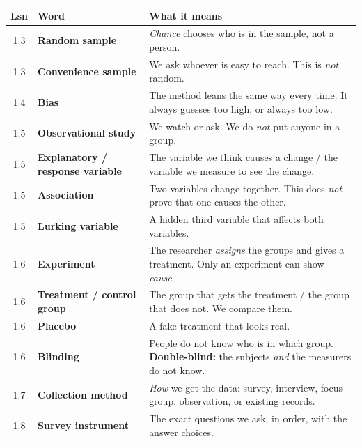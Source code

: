 \documentclass[10pt]{article}
\begin{document}
\vspace{4pt}
\boxguard[16]
\begin{tabularx}{\linewidth}{@{} c >{\raggedright\arraybackslash\bfseries}p{3.4cm} X @{}}
\rowcolor{frost}
\textbf{Lsn} & \textbf{Word} & \textbf{What it means} \\
\midrule
1.3 & Random sample & \emph{Chance} chooses who is in the sample, not a person. \\
1.3 & Convenience sample & We ask whoever is easy to reach. This is \emph{not} random. \\
1.4 & Bias & The method leans the same way every time. It always guesses too high, or always
      too low. \\
1.5 & Observational study & We watch or ask. We do \emph{not} put anyone in a group. \\
1.5 & Explanatory / response variable & The variable we think causes a change / the variable
      we measure to see the change. \\
1.5 & Association & Two variables change together. This does \emph{not} prove that one causes
      the other. \\
1.5 & Lurking variable & A hidden third variable that affects both variables. \\
1.6 & Experiment & The researcher \emph{assigns} the groups and gives a treatment. Only an
      experiment can show \emph{cause}. \\
1.6 & Treatment / control group & The group that gets the treatment / the group that does not.
      We compare them. \\
1.6 & Placebo & A fake treatment that looks real. \\
1.6 & Blinding & People do not know who is in which group. \textbf{Double-blind:} the
      subjects \emph{and} the measurers do not know. \\
1.7 & Collection method & \emph{How} we get the data: survey, interview, focus group,
      observation, or existing records. \\
1.8 & Survey instrument & The exact questions we ask, in order, with the answer choices. \\
\end{tabularx}
\end{document}
